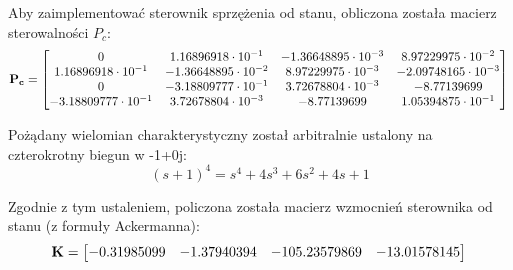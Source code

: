 \documentclass{article}
\begin{document}
Aby zaimplementować sterownik sprzężenia od stanu, obliczona została macierz sterowalności $P_c$:
\begin{equation}\label{eq:pc_matrix}
\mathbf{P_c} = \begin{bmatrix}  0 & 1.16896918\cdot10^{-1} & -1.36648895\cdot10^{-3} & 8.97229975\cdot10^{-2} \\
  							   1.16896918\cdot10^{-1} & -1.36648895\cdot10^{-2} & 8.97229975\cdot10^{-3} & -2.09748165\cdot10^{-3} \\
  							  0 & -3.18809777\cdot10^{-1} & 3.72678804\cdot10^{-3} & -8.77139699 \\
  							   -3.18809777\cdot10^{-1} & 3.72678804\cdot10^{-3} & -8.77139699 & 1.05394875\cdot10^{-1} \\ 
  			   \end{bmatrix} \\ \\
\end{equation}

Pożądany wielomian charakterystyczny został arbitralnie ustalony na czterokrotny biegun w -1+0j:
\begin{equation}\label{eq:des_ch_poly}
 (s + 1)^4 = s^4 + 4s^3 + 6s^2 + 4s + 1
\end{equation}

Zgodnie z tym ustaleniem, policzona została macierz wzmocnień sterownika od stanu (z formuły Ackermanna):
\begin{equation}\label{eq:k_matrix}
\mathbf{K} = \begin{bmatrix}  -0.31985099 & -1.37940394 & -105.23579869 & -13.01578145 \\
  			   \end{bmatrix} \\ \\
\end{equation}
\end{document}
